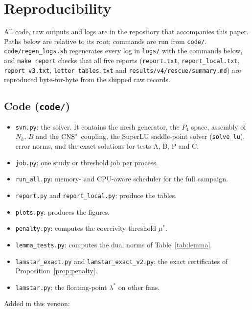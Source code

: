 \section{Reproducibility}\label{app:repro}

All code, raw outputs and logs are in the repository that accompanies this paper. Paths below are relative to its root; commands are run from \texttt{code/}. \texttt{code/regen\_logs.sh} regenerates every log in \texttt{logs/} with the commands below, and \texttt{make report} checks that all five reports (\texttt{report.txt}, \texttt{report\_local.txt}, \texttt{report\_v3.txt}, \texttt{letter\_tables.txt} and \texttt{results/v4/rescue/summary.md}) are reproduced byte-for-byte from the shipped raw records.

\subsection*{Code (\texttt{code/})}
\begin{itemize}
\item \texttt{svn.py}: the solver. It contains the mesh generator, the $P_4$ space, assembly of $N_h$, $B$ and the $\mathrm{CNS}^\ast$ coupling, the SuperLU saddle-point solver (\texttt{solve\_lu}), error norms, and the exact solutions for tests A, B, P and C.
\item \texttt{job.py}: one study or threshold job per process.
\item \texttt{run\_all.py}: memory- and CPU-aware scheduler for the full campaign.
\item \texttt{report.py} and \texttt{report\_local.py}: produce the tables.
\item \texttt{plots.py}: produces the figures.
\item \texttt{penalty.py}: computes the coercivity threshold $\mu^\ast$.
\item \texttt{lemma\_tests.py}: computes the dual norms of Table~\ref{tab:lemma}.
\item \texttt{lamstar\_exact.py} and \texttt{lamstar\_exact\_v2.py}: the exact certificates of Proposition~\ref{prop:penalty}.
\item \texttt{lamstar.py}: the floating-point $\lambda^\ast$ on other fans.
\end{itemize}
Added in this version:
